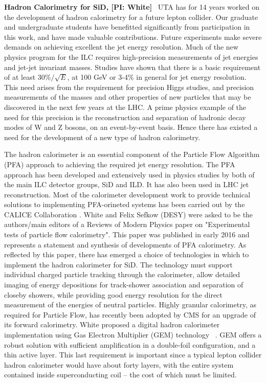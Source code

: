 
\textbf{Hadron Calorimetry for SiD, [PI: White]} \
UTA has for 14 years worked on the development of hadron calorimetry for a future lepton collider.
Our graduate and undergraduate students have benefitted significantly from participation in this work,
and have made valuable contributions.
Future experiments make severe demands on achieving excellent the jet energy resolution.
Much of the new physics program for the ILC requires high-precision measurements of jet
energies and jet-jet invariant masses.  Studies have shown that there is a basic requirement of at least $30\%/\sqrt{E}$,
at 100 GeV or 3-4\% in general for jet energy resolution. 
This need arises from the requirement for precision Higgs studies, and precision measurements
of the masses and other properties of new particles that may be discovered in the next few years at the LHC.
A prime physics example of the need for this precision is the reconstruction and 
separation of hadronic decay modes of W and Z bosons, on an event-by-event basis. 
Hence there has existed a need for the development of a new type of hadron calorimetry.

The hadron calorimeter is an essential component of the Particle Flow Algorithm (PFA) approach to achieving the required
jet energy resolution. The PFA approach has been developed and extensively used in physics studies by both of the 
main ILC detector groups, SiD and ILD. It has also been used in LHC jet reconstruction. Most of the calorimeter 
development work to provide technical solutions to implementing PFA-orineted systems has been carried out by the 
CALICE Collaboration \cite{CALICE}. White and Felix Sefkow (DESY) were 
asked to be the authors/main editors of a Reviews of Modern Physics paper on "Experimental tests of particle flow calorimetry".
This paper was published \cite{RMPCALICE} in early 2016 and represents a statement and synthesis of developments of PFA calorimetry. 
As reflected by this paper, there has emerged a choice of technologies in which to implement the hadron calorimeter for SiD.
The technology must support individual charged particle tracking through the calorimeter, allow detailed imaging of energy 
depositions for track-shower association and separation of closeby showers, while providing good energy resolution for the
direct measurement of the energies of neutral particles. Highly granular calorimetry, as required for Particle Flow, has recently been adopted by CMS for an upgrade of its forward calorimetry.
White proposed \cite{GEMDHCAL} a digital hadron calorimeter implementation using Gas Electron Multiplier (GEM) technology ~\cite{Sauli}.
GEM offers a robust solution with sufficient amplification in a double-foil configuration, and a thin active layer. 
This last requirement is important since a typical lepton collider hadron calorimeter would have about forty layers, with the 
entire system contained inside superconducting coil -- the cost of which must be limited.

